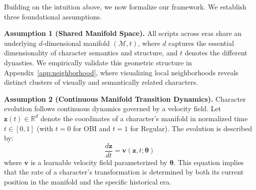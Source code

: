 \documentclass{article}
\begin{document}
Building on the intuition above, we now formalize our framework. We establish three foundational assumptions.

\textbf{Assumption 1 (Shared Manifold Space).} All scripts across eras share an underlying $d$-dimensional manifold $(\mathcal{M}, t)$, where $d$ captures the essential dimensionality of character semantics and structure, and $t$ denotes the different dynasties. We empirically validate this geometric structure in Appendix~\ref{app:neighborhood}, where visualizing local neighborhoods reveals distinct clusters of visually and semantically related characters.

\textbf{Assumption 2 (Continuous Manifold Transition Dynamics).} Character evolution follows continuous dynamics governed by a velocity field. Let $\mathbf{z}(t) \in \mathbb{R}^d$ denote the coordinates of a character's manifold in normalized time $t \in [0,1]$ (with $t=0$ for OBI and $t=1$ for Regular). The evolution is described by:
\begin{equation}
\frac{d\mathbf{z}}{dt} = \mathbf{v}(\mathbf{z}, t; \boldsymbol{\theta})
\label{eq:dynamics}
\end{equation}
where $\mathbf{v}$ is a learnable velocity field parameterized by $\boldsymbol{\theta}$. This equation implies that the rate of a character's transformation is determined by both its current position in the manifold and the specific historical era. %


\end{document}
